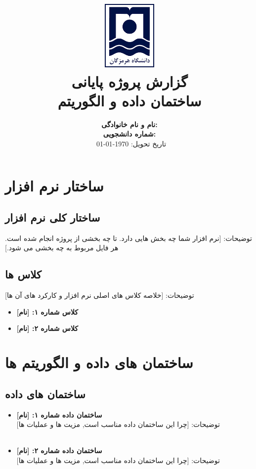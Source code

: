 \documentclass[12pt]{article}
\title{
	\vspace*{-2cm}
	\includegraphics[width=0.2\textwidth]{university-logo}\\
	\vspace{1cm}
	\textcolor{primary}{\bfseries  گزارش پروژه پایانی}\\
	\Huge ساختمان داده و الگوریتم
}
\author{
	\large
	\textbf{نام و نام خانوادگی:} \hrulefill \\
	\vspace{0.5cm}
	\textbf{شماره دانشجویی:} \hrulefill \\
	\vspace{1cm}
	\textcolor{primary}{\faCalendar\ تاریخ تحویل: \today}
}
\date{}
\begin{document}
	
	\maketitle
	\thispagestyle{empty}
	
	\newpage
	\renewcommand{\contentsname}{\textcolor{primary}{فهرست مطالب}}
	\tableofcontents
	\newpage
	
	
	\section{ساختار نرم افزار}
	\subsection{ساختار کلی نرم افزار}
	توضیحات: [نرم افزار شما چه بخش هایی دارد. تا چه بخشی از پروژه انجام شده است. هر فایل مربوط به چه بخشی می شود.]
	\subsection{کلاس ها}
	توضیحات: [خلاصه کلاس های اصلی نرم افزار و کارکرد های آن ها]
	\begin{itemize}[noitemsep]
		\item \textbf{کلاس شماره ۱: [نام]}\\
		\lipsum[8]
		\item \textbf{کلاس شماره ۲: [نام]}\\
		\lipsum[8]
		
	\end{itemize}
	\newpage
	\section{ساختمان های داده و الگوریتم ها}
\subsection{ساختمان های داده}
\begin{itemize}[noitemsep]
	\item \textbf{ساختمان داده شماره ۱: [نام]}\\
	توضیحات: [چرا این ساختمان داده مناسب است, مزیت ها و عملیات ها]\\
	\lipsum[8]
	\\
	\item \textbf{ساختمان داده شماره ۲: [نام]}\\
	توضیحات: [چرا این ساختمان داده مناسب است, مزیت ها و عملیات ها]\\
	\lipsum[8]
\end{itemize}
\end{document}
